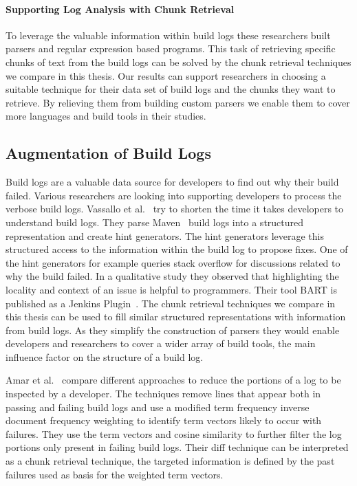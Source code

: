 \documentclass[\myrootdir/main.tex]{subfiles}
\begin{document}
\paragraph{Supporting Log Analysis with Chunk Retrieval}
To leverage the valuable information within build logs these researchers built parsers and regular expression based programs.
This task of retrieving specific chunks of text from the build logs can be solved by the chunk retrieval techniques we compare in this thesis.
Our results can support researchers in choosing a suitable technique for their data set of build logs and the chunks they want to retrieve.
By relieving them from building custom parsers we enable them to cover more languages and build tools in their studies.

\subsection{Augmentation of Build Logs}
\label{sec:rw-bl-analysis}
Build logs are a valuable data source for developers to find out why their build failed.
Various researchers are looking into supporting developers to process the verbose build logs.
Vassallo et al.~\cite{vassallo2018un-break} try to shorten the time it takes developers to understand build logs.
They parse Maven~\cite{maven2019website} build logs into a structured representation and create hint generators.
The hint generators leverage this structured access to the information within the build log to propose fixes.
One of the hint generators for example queries stack overflow for discussions related to why the build failed.
In a qualitative study they observed that highlighting the locality and context of an issue is helpful to programmers.
Their tool BART is published as a Jenkins Plugin~\cite{bart2019plugin}.
The chunk retrieval techniques we compare in this thesis can be used to fill similar structured representations with information from build logs.
As they simplify the construction of parsers they would enable developers and researchers to cover a wider array of build tools, the main influence factor on the structure of a build log.

Amar et al.~\cite{amar2019mining} compare different approaches to reduce the portions of a log to be inspected by a developer.
The techniques remove lines that appear both in passing and failing build logs and use a modified term frequency inverse document frequency weighting to identify term vectors likely to occur with failures.
They use the term vectors and cosine similarity to further filter the log portions only present in failing build logs.
Their diff technique can be interpreted as a chunk retrieval technique, the targeted information is defined by the past failures used as basis for the weighted term vectors.
\end{document}
